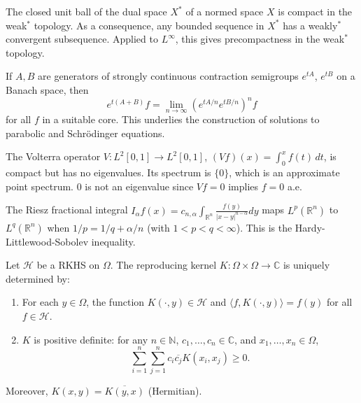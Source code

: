 \begin{example}
The closed unit ball of the dual space $X^*$ of a normed space $X$ is compact in the weak$^*$ topology. As a consequence, any bounded sequence in $X^*$ has a weakly$^*$ convergent subsequence. Applied to $L^\infty$, this gives precompactness in the weak$^*$ topology.
\end{example}

\begin{example}
If $A, B$ are generators of strongly continuous contraction semigroups $e^{tA}$, $e^{tB}$ on a Banach space, then
\[ e^{t(A+B)} f = \lim_{n\to\infty} \left(e^{tA/n} e^{tB/n}\right)^n f \]
for all $f$ in a suitable core. This underlies the construction of solutions to parabolic and Schrödinger equations.
\end{example}

\begin{example}
The Volterra operator $V: L^2[0,1] \to L^2[0,1]$, $(Vf)(x) = \int_0^x f(t)\,dt$, is compact but has no eigenvalues. Its spectrum is $\{0\}$, which is an approximate point spectrum. 0 is not an eigenvalue since $Vf = 0$ implies $f = 0$ a.e.
\end{example}

\begin{example}
The Riesz fractional integral $I_\alpha f(x) = c_{n,\alpha} \int_{\mathbb{R}^n} \frac{f(y)}{|x-y|^{n-\alpha}} dy$ maps $L^p(\mathbb{R}^n)$ to $L^q(\mathbb{R}^n)$ when $1/p = 1/q + \alpha/n$ (with $1 < p < q < \infty$). This is the Hardy-Littlewood-Sobolev inequality.
\end{example}

\begin{definition}
Let $\mathcal{H}$ be a RKHS on $\Omega$. The reproducing kernel $K: \Omega \times \Omega \to \mathbb{C}$ is uniquely determined by:
\begin{enumerate}
    \item For each $y \in \Omega$, the function $K(\cdot, y) \in \mathcal{H}$ and $\langle f, K(\cdot, y) \rangle = f(y)$ for all $f \in \mathcal{H}$.
    \item $K$ is positive definite: for any $n \in \mathbb{N}$, $c_1, \ldots, c_n \in \mathbb{C}$, and $x_1, \ldots, x_n \in \Omega$,
    \[ \sum_{i=1}^n \sum_{j=1}^n c_i \overline{c_j} K(x_i, x_j) \geq 0. \]
\end{enumerate}
Moreover, $K(x,y) = \overline{K(y,x)}$ (Hermitian).
\end{definition}

